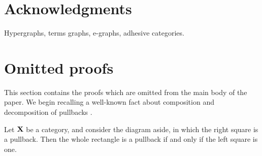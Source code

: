 \documentclass[3p]{elsarticle}
\def\X{\textbf {\textup{X}}}
\theoremstyle{remark}
\theoremstyle{definition}
\begin{document}
\section*{Acknowledgments}
Hypergraphs, terms graphs, e-graphs, adhesive categories.





\appendix
\renewcommand{\thesection}{\Alph{section}}
\section{Omitted proofs}

This section contains the proofs which are omitted from the main body of the paper. 
%
We begin recalling  a well-known fact about composition and decomposition of pullbacks \cite[Lem.~1.1]{lack2005adhesive}.

\noindent
\begin{minipage}[l]{.75\linewidth}
\begin{lem}\label{lem:pb1}
	Let $\X$ be a category, and consider the diagram aside, in which the right square is a pullback. Then the whole rectangle is a pullback if and only if the left square is one.
\end{lem}
\end{minipage} \hfill
\begin{minipage}[r]{.20\linewidth}
\end{minipage}
	
\end{document}
